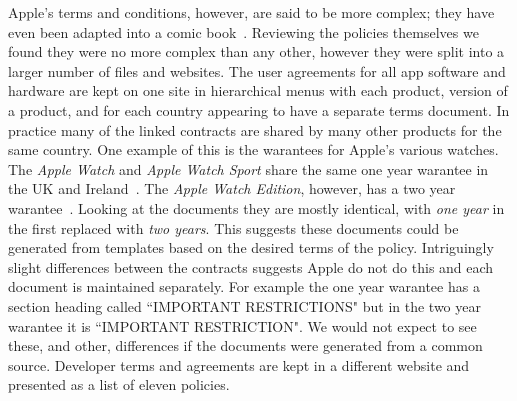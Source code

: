 \documentclass[thesis.tex]{subfiles}
\begin{document}
Apple's terms and conditions, however, are said to be more complex; they have even been adapted into a comic book~\cite{r._sikoryak_terms_2017}. 
Reviewing the policies themselves we found they were no more complex than any other, however they were split into a larger number of files and websites.
The user agreements for all app software and hardware are kept on one site in hierarchical menus with each product, version of a product, and for each country appearing to have a separate terms document.  In practice many of the linked contracts are shared by many other products for the same country.
One example of this is the warantees for Apple's various watches.  The \emph{Apple Watch} and \emph{Apple Watch Sport} share the same one year warantee in the UK and Ireland~\cite{noauthor_apple_nodate}.
The \emph{Apple Watch Edition}, however, has a two year warantee~\cite{noauthor_apple_nodate-1}.  Looking at the documents they are mostly identical, with \emph{one year} in the first replaced with \emph{two years}.  This suggests these documents could be generated from templates based on the desired terms of the policy.  Intriguingly slight differences between the contracts suggests Apple do not do this and each document is maintained separately.  For example the one year warantee has a section heading called ``IMPORTANT RESTRICTIONS" but in the two year warantee it is ``IMPORTANT RESTRICTION".  We would not expect to see these, and other, differences if the documents were generated from a common source.
Developer terms and agreements are kept in a different website and presented as a list of eleven policies.
\end{document}
